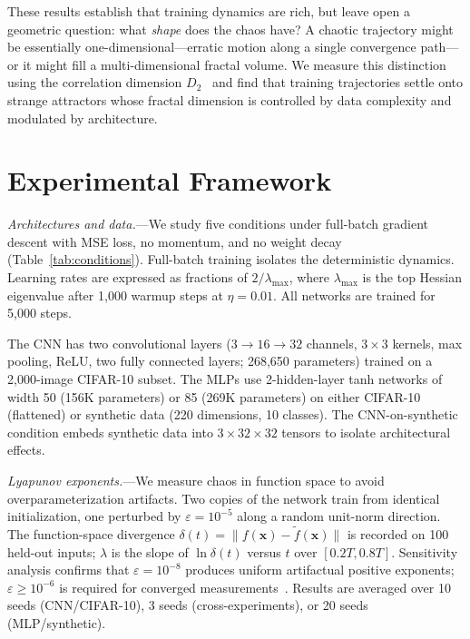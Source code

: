 \documentclass[aps,prl,twocolumn,superscriptaddress,floatfix]{revtex4-2}
\begin{document}
These results establish that training dynamics are rich, but leave open a geometric question: what \textit{shape} does the chaos have? A chaotic trajectory might be essentially one-dimensional---erratic motion along a single convergence path---or it might fill a multi-dimensional fractal volume. We measure this distinction using the correlation dimension $D_2$~\cite{grassberger1983} and find that training trajectories settle onto strange attractors whose fractal dimension is controlled by data complexity and modulated by architecture.

\section{Experimental Framework}

\textit{Architectures and data.}---We study five conditions under full-batch gradient descent with MSE loss, no momentum, and no weight decay (Table~\ref{tab:conditions}). Full-batch training isolates the deterministic dynamics. Learning rates are expressed as fractions of $2/\lambda_{\max}$, where $\lambda_{\max}$ is the top Hessian eigenvalue after 1{,}000 warmup steps at $\eta = 0.01$. All networks are trained for 5{,}000 steps.

The CNN has two convolutional layers ($3{\to}16{\to}32$ channels, $3{\times}3$ kernels, max pooling, ReLU, two fully connected layers; 268{,}650 parameters) trained on a 2{,}000-image CIFAR-10 subset. The MLPs use 2-hidden-layer tanh networks of width 50 (156K parameters) or 85 (269K parameters) on either CIFAR-10 (flattened) or synthetic data (220 dimensions, 10 classes). The CNN-on-synthetic condition embeds synthetic data into $3{\times}32{\times}32$ tensors to isolate architectural effects.

\textit{Lyapunov exponents.}---We measure chaos in function space to avoid overparameterization artifacts. Two copies of the network train from identical initialization, one perturbed by $\varepsilon = 10^{-5}$ along a random unit-norm direction. The function-space divergence $\delta(t) = \lVert f(\mathbf{x}) - \tilde{f}(\mathbf{x}) \rVert$ is recorded on 100 held-out inputs; $\lambda$ is the slope of $\ln\delta(t)$ versus $t$ over $[0.2T, 0.8T]$. Sensitivity analysis confirms that $\varepsilon = 10^{-8}$ produces uniform artifactual positive exponents; $\varepsilon \geq 10^{-6}$ is required for converged measurements~\cite{sm}. Results are averaged over 10 seeds (CNN/CIFAR-10), 3 seeds (cross-experiments), or 20 seeds (MLP/synthetic).
\end{document}
